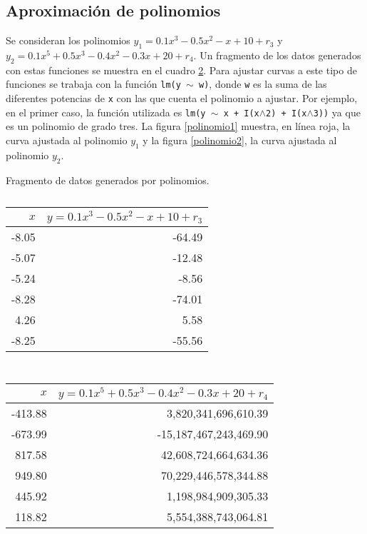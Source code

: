 \documentclass[12pt,letterpaper]{article}
\begin{document}
\subsection{Aproximación de polinomios}
Se consideran los polinomios $y_1=0.1x^3 - 0.5x^2 - x + 10 + r_3$ y $y_2=0.1x^5 +0.5x^3 - 0.4x^2 - 0.3x + 20 + r_4$. Un fragmento de los datos generados con estas funciones se muestra en el cuadro \ref{polis}. Para ajustar curvas a este tipo de funciones \cite{scatterplot} se trabaja con la función \texttt{lm(y $\sim$ w)}, donde \texttt{w} es la suma de las diferentes potencias de \texttt{x} con las que cuenta el polinomio a ajustar. Por ejemplo, en el primer caso, la función utilizada es \texttt{lm(y $\sim$ x + I(x$\wedge$2) + I(x$\wedge$3))} ya que es un polinomio de grado tres. La figura \ref{polinomio1} muestra, en línea roja, la curva ajustada al polinomio $y_1$ y la figura \ref{polinomio2}, la curva ajustada al polinomio $y_2$.
\begin{table}
\caption{Fragmento de datos generados por polinomios.}
\begin{subtable}{0.3\textwidth}
	\centering
	\caption{}
	\begin{tabular}{rr}
  \hline
$x$ & $ y=0.1x^3 - 0.5x^2 - x + 10 + r_3$  \\ 
  \hline
-8.05 & -64.49 \\ 
-5.07 & -12.48 \\ 
-5.24 & -8.56 \\ 
-8.28 & -74.01 \\ 
4.26 & 5.58 \\ 
-8.25 & -55.56 \\ 
   \hline
\end{tabular}
	\label{c}
\end{subtable}$\qquad \qquad \qquad \quad$\begin{subtable}{0.3\textwidth}
	\centering
	\caption{}
\begin{tabular}{rr}
  \hline
 $x$ & $ y=0.1x^5 +0.5x^3 - 0.4x^2 - 0.3x + 20 + r_4$ \\ 
  \hline
-413.88 & 3,820,341,696,610.39 \\ 
-673.99 & -15,187,467,243,469.90 \\ 
817.58 & 42,608,724,664,634.36 \\ 
949.80 & 70,229,446,578,344.88 \\ 
445.92 & 1,198,984,909,305.33 \\ 
118.82 & 5,554,388,743,064.81 \\
   \hline
\end{tabular}
	\label{b}
\end{subtable}
\label{polis}
\end{table}
\end{document}
